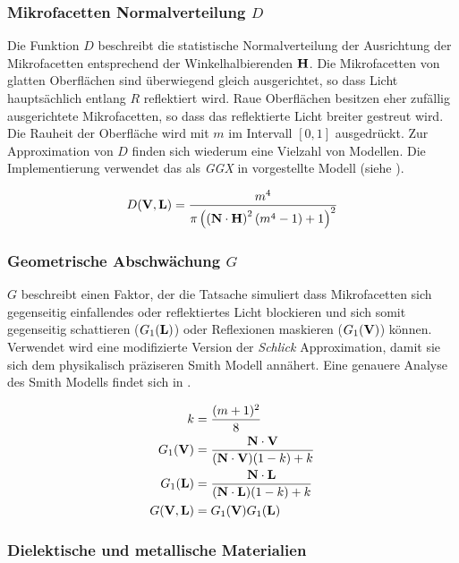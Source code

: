 \subsubsection[Mikrofacetten Normalverteilung]{Mikrofacetten Normalverteilung $D$} 
Die Funktion $D$ beschreibt die statistische Normalverteilung der Ausrichtung der Mikrofacetten entsprechend der Winkelhalbierenden $\mathbf H$. Die Mikrofacetten von glatten Oberflächen sind überwiegend gleich ausgerichtet, so dass Licht hauptsächlich entlang $R$ reflektiert wird. Raue Oberflächen besitzen eher zufällig ausgerichtete Mikrofacetten, so dass das reflektierte Licht breiter gestreut wird. Die Rauheit der Oberfläche wird mit $m$ im Intervall $[0,1]$ ausgedrückt. Zur Approximation von $D$ finden sich wiederum eine Vielzahl von Modellen. Die Implementierung verwendet das als \textit{GGX} in \cite{Walter2007} vorgestellte Modell (siehe ).

\begin{align}
	\label{eq:ggx}
	D(\mathbf V,\mathbf L) = \frac{m^4}{ \pi \left(\left( \mathbf N \cdot \mathbf H \right)^2\left(m^4 - 1\right) + 1\right)^2}
\end{align}


\subsubsection[Geometrische Abschwächung]{Geometrische Abschwächung $G$} 
$G$ beschreibt einen Faktor, der die Tatsache simuliert dass Mikrofacetten sich gegenseitig einfallendes oder reflektiertes Licht blockieren und sich somit gegenseitig schattieren ($G_1(\mathbf L)$) oder Reflexionen maskieren ($G_1(\mathbf V)$) können. Verwendet wird eine modifizierte Version der \textit{Schlick} Approximation, damit sie sich dem physikalisch präziseren Smith Modell annähert. Eine genauere Analyse des Smith Modells findet sich in \cite[Kapitel 6, Seite 33]{Heitz2014}.

\begin{align}
	\label{eq:geometric-schlick}
	k &= \frac{(m + 1)^2}{8}\\
	G_1(\mathbf V) &= \frac{\mathbf N \cdot \mathbf V}{(\mathbf N \cdot \mathbf V)(1-k)+k}\\
	G_1(\mathbf L) &= \frac{\mathbf N \cdot \mathbf L}{(\mathbf N \cdot \mathbf L)(1-k)+k}\\
	G(\mathbf V,\mathbf L) &= G_1(\mathbf V) G_1(\mathbf L)
\end{align}


\subsubsection{Dielektische und metallische Materialien}\label{sec:pbr-dielektisch}

